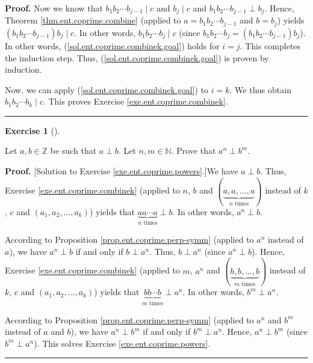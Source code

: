 \documentclass[numbers=enddot,12pt,final,onecolumn,notitlepage]{scrartcl}%
\newcounter{exer}
\numberwithin{exer}{subsection}
\theoremstyle{definition}
\newtheorem{exmp}[exer]{Exercise}
\newenvironment{exercise}[1][]
{\begin{exmp}[#1]\begin{leftbar}}
{\end{leftbar}\end{exmp}}
\newenvironment{fineprint}{\begin{small}}{\end{small}}
\newenvironment{proof}[1][Proof]{\noindent\textbf{#1.} }{\ \rule{0.5em}{0.5em}}
\begin{document}
\begin{fineprint}
\begin{proof}
Now we know that $b_{1}b_{2}\cdots b_{j-1}\mid c$ and $b_{j}\mid c$ and
$b_{1}b_{2}\cdots b_{j-1}\perp b_{j}$. Hence, Theorem
\ref{thm.ent.coprime.combine} (applied to $a=b_{1}b_{2}\cdots b_{j-1}$ and
$b=b_{j}$) yields $\left(  b_{1}b_{2}\cdots b_{j-1}\right)  b_{j}\mid c$. In
other words, $b_{1}b_{2}\cdots b_{j}\mid c$ (since $b_{1}b_{2}\cdots
b_{j}=\left(  b_{1}b_{2}\cdots b_{j-1}\right)  b_{j}$). In other words,
(\ref{sol.ent.coprime.combinek.goal}) holds for $i=j$. This completes the
induction step. Thus, (\ref{sol.ent.coprime.combinek.goal}) is proven by induction.

Now, we can apply (\ref{sol.ent.coprime.combinek.goal}) to $i=k$. We thus
obtain $b_{1}b_{2}\cdots b_{k}\mid c$. This proves Exercise
\ref{exe.ent.coprime.combinek}.
\end{proof}
\end{fineprint}

\begin{exercise}
\label{exe.ent.coprime.powers}Let $a,b\in\mathbb{Z}$ be such that $a\perp b$.
Let $n,m\in\mathbb{N}$. Prove that $a^{n}\perp b^{m}$.
\end{exercise}

\begin{fineprint}
\begin{proof}
[Solution to Exercise \ref{exe.ent.coprime.powers}.]We have $a\perp b$. Thus,
Exercise \ref{exe.ent.coprime.combinek} (applied to $n$, $b$ and $\left(
\underbrace{a,a,\ldots,a}_{n\text{ times}}\right)  $ instead of $k$, $c$ and
$\left(  a_{1},a_{2},\ldots,a_{k}\right)  $) yields that $\underbrace{aa\cdots
a}_{n\text{ times}}\perp b$. In other words, $a^{n}\perp b$.

According to Proposition \ref{prop.ent.coprime.perp-symm} (applied to $a^{n}$
instead of $a$), we have $a^{n}\perp b$ if and only if $b\perp a^{n}$. Thus,
$b\perp a^{n}$ (since $a^{n}\perp b$). Hence, Exercise
\ref{exe.ent.coprime.combinek} (applied to $m$, $a^{n}$ and $\left(
\underbrace{b,b,\ldots,b}_{m\text{ times}}\right)  $ instead of $k$, $c$ and
$\left(  a_{1},a_{2},\ldots,a_{k}\right)  $) yields that $\underbrace{bb\cdots
b}_{m\text{ times}}\perp a^{n}$. In other words, $b^{m}\perp a^{n}$.

According to Proposition \ref{prop.ent.coprime.perp-symm} (applied to $a^{n}$
and $b^{m}$ instead of $a$ and $b$), we have $a^{n}\perp b^{m}$ if and only if
$b^{m}\perp a^{n}$. Hence, $a^{n}\perp b^{m}$ (since $b^{m}\perp a^{n}$). This
solves Exercise \ref{exe.ent.coprime.powers}.
\end{proof}
\end{fineprint}
\end{document}

